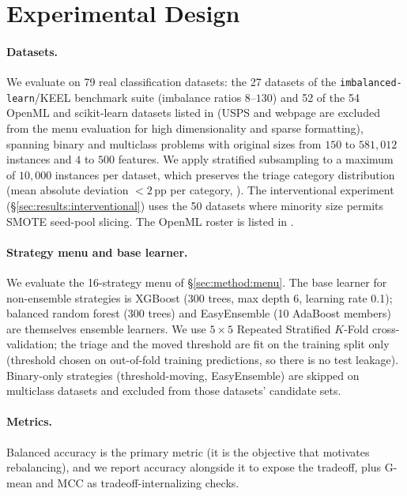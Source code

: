 \section{Experimental Design}\label{sec:design}

\paragraph{Datasets.} We evaluate on 79 real classification datasets: the 27
datasets of the \texttt{imbalanced-learn}/KEEL benchmark suite (imbalance ratios
$8$--$130$) and 52 of the 54 OpenML \cite{vanschoren2014openml} and scikit-learn
datasets listed in  (USPS and webpage are excluded from
the menu evaluation for high dimensionality and sparse formatting), spanning binary
and multiclass problems with original sizes from $150$ to $581{,}012$ instances and
$4$ to $500$ features. We apply stratified
subsampling to a maximum of $10{,}000$ instances per dataset, which preserves the
triage category distribution (mean absolute deviation $<2$\,pp per category,
). The interventional experiment
(\S\ref{sec:results:interventional}) uses the 50 datasets where minority
size permits SMOTE seed-pool slicing. The OpenML roster is listed in
.

\paragraph{Strategy menu and base learner.} We evaluate the 16-strategy menu of
\S\ref{sec:method:menu}. The base learner for non-ensemble strategies is
XGBoost \cite{chen2016xgboost} (300 trees, max depth 6, learning rate 0.1);
balanced random forest (300 trees) and EasyEnsemble (10 AdaBoost members) are
themselves ensemble learners. We use $5\times5$ Repeated Stratified $K$-Fold
cross-validation; the triage and the moved threshold are fit on the training
split only (threshold chosen on out-of-fold training predictions, so there is no
test leakage). Binary-only strategies (threshold-moving, EasyEnsemble) are skipped
on multiclass datasets and excluded from those datasets' candidate sets.

\paragraph{Metrics.} Balanced accuracy is the primary metric (it is the
objective that motivates rebalancing), and we report accuracy alongside it to
expose the tradeoff, plus G-mean and MCC as tradeoff-internalizing checks.

